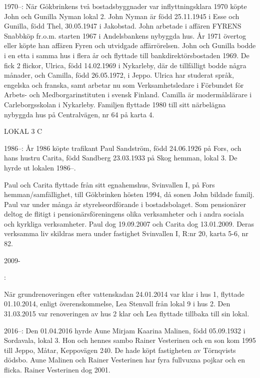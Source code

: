  1970--:
När Gökbrinkens två bostadsbyggnader var inflyttningsklara 1970 köpte John och Gunilla Nyman lokal 2. John Nyman är född 25.11.1945 i Esse och Gunilla, född Thel, 30.05.1947 i Jakobstad. John arbetade i affären FYRENS Snabbköp fr.o.m. starten 1967 i Andelsbankens nybyggda hus. År 1971 övertog eller köpte han affären Fyren och utvidgade affärrörelsen. John och Gunilla bodde i en etta i samma hus i flera år och flyttade till bankdirektörsbostaden 1969. De fick 2 flickor, Ulrica, född 14.02.1969 i Nykarleby, där de tillfälligt bodde några månader, och Camilla, född 26.05.1972, i Jeppo.  Ulrica har studerat språk, engelska och franska, samt arbetar nu som Verksamhetsledare i Förbundet för Arbets- och Medborgarinstituten i svensk Finland.  Camilla är modermålslärare i Carleborgsskolan i Nykarleby. Familjen flyttade 1980 till sitt närbelägna nybyggda hus på Centralvägen, nr 64 på karta 4.


LOKAL 3 C

 1986--:
År 1986 köpte trafikant Paul Sandström, född 24.06.1926 på Fors, och hans hustru Carita, född Sandberg 23.03.1933 på Skog hemman, lokal 3. De hyrde ut lokalen 1986--.

Paul och Carita flyttade från sitt egnahemshus, Svinvallen I, på Fors hemman/samfällighet, till Gökbrinken hösten 1994, då sonen John bildade familj. Paul var under många år styrelseordförande i bostadsbolaget. Som pensionärer deltog de flitigt i pensionärsföreningens olika verksamheter och i andra sociala och kyrkliga verksamheter. Paul dog 19.09.2007 och Carita dog 13.01.2009. Deras verksamma liv skildras mera under fastighet Svinvallen I, R:nr 20, karta 5-6, nr 82.

 2009-

:

När grundrenoveringen efter vattenskadan 24.01.2014 var klar i hus 1, flyttade 01.10.2014, enligt överenskommelse, Lea Stenvall från lokal 9 i hus 2. Den 31.03.2015 var renoveringen av hus 2 klar och Lea flyttade tillbaka till sin lokal.

2016--: Den 01.04.2016 hyrde Aune Mirjam Kaarina Malinen, född 05.09.1932 i Sordavala, lokal 3. Hon och hennes sambo Rainer Vesterinen och en son kom 1995 till Jeppo, Måtar, Keppovägen 240. De hade köpt fastigheten av Törnqvists dödsbo. Aune Malinen och Rainer Vesterinen har fyra fullvuxna pojkar och en flicka. Rainer Vesterinen dog 2001.

